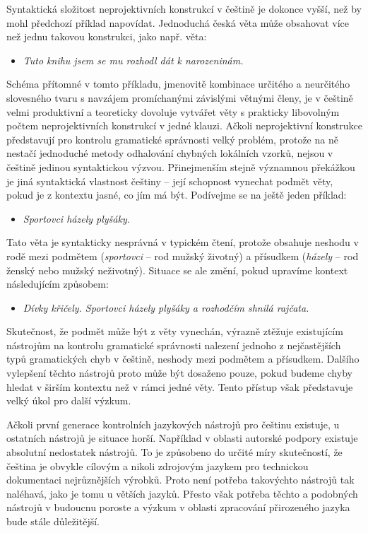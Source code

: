 \documentclass[]{../../metanetpaper}
\begin{document}
\begin{multicols}{2}
Syntaktická složitost neprojektivních konstrukcí v češtině je dokonce vyšší, než by mohl předchozí příklad napovídat. Jednoduchá česká věta může obsahovat více než jednu takovou konstrukci, jako např. věta:
\begin{itemize}
\item[] \textit{Tuto knihu jsem se mu rozhodl dát k narozeninám.}
\end{itemize}
Schéma přítomné v tomto příkladu, jmenovitě kombinace určitého a neurčitého slovesného tvaru s navzájem promíchanými závislými větnými členy, je v češtině velmi produktivní a teoreticky dovoluje vytvářet věty s prakticky libovolným počtem neprojektivních konstrukcí v jedné klauzi.
Ačkoli neprojektivní konstrukce představují pro kontrolu gramatické správnosti velký problém, protože na ně nestačí jednoduché metody odhalování chybných lokálních vzorků, nejsou v češtině jedinou syntaktickou výzvou. Přinejmenším stejně významnou překážkou je jiná syntaktická vlastnost češtiny – její schopnost vynechat podmět věty, pokud je z kontextu jasné, co jím má být. Podívejme se na ještě jeden příklad:
\begin{itemize}
\item[]\textit{Sportovci házely plyšáky.}
\end{itemize}
Tato věta je syntakticky nesprávná v typickém čtení, protože obsahuje neshodu v rodě mezi podmětem (\textit{sportovci} – rod mužský životný) a přísudkem (\textit{házely} – rod ženský nebo mužský neživotný). Situace se ale změní, pokud upravíme kontext následujícím způsobem:
\begin{itemize}
\item[]\textit{Dívky křičely. Sportovci házely plyšáky a rozhodčím shnilá rajčata.}
\end{itemize}
Skutečnost, že podmět může být z věty vynechán, výrazně ztěžuje existujícím nástrojům na kontrolu gramatické správnosti nalezení jednoho z nejčastějších typů gramatických chyb v češtině, neshody mezi podmětem a přísudkem. Dalšího vylepšení těchto nástrojů proto může být dosaženo pouze, pokud budeme chyby hledat v širším kontextu než v rámci jedné věty. Tento přístup však představuje velký úkol pro další výzkum.

Ačkoli první generace kontrolních jazykových nástrojů pro češtinu existuje, u ostatních nástrojů je situace horší. Například v oblasti autorské podpory existuje absolutní nedostatek nástrojů. To je způsobeno do určité míry skutečností, že čeština je obvykle cílovým a nikoli zdrojovým jazykem pro technickou dokumentaci nejrůznějších výrobků. Proto není potřeba takovýchto nástrojů tak naléhavá, jako je tomu u větších jazyků. Přesto však potřeba těchto a podobných nástrojů v budoucnu poroste a výzkum v oblasti zpracování přirozeného jazyka bude stále důležitější.
  

\end{multicols}
\end{document}
